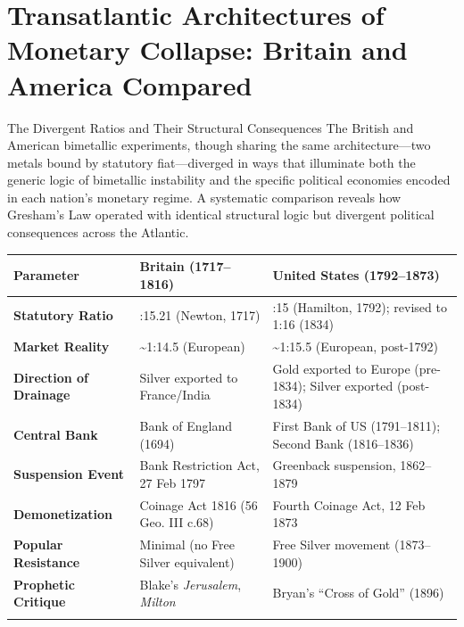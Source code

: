 \documentclass[
  ignorenonframetext,
]{beamer}
\author{\texorpdfstring{}{}}
\date{}
\newcounter{none} %
\begin{document}
\section{Transatlantic Architectures of Monetary Collapse: Britain and
America
Compared}\label{transatlantic-architectures-of-monetary-collapse-britain-and-america-compared}

\begin{frame}{The Divergent Ratios and Their Structural Consequences}
\protect{}\label{the-divergent-ratios-and-their-structural-consequences}
The British and American bimetallic experiments, though sharing the same
architecture---two metals bound by statutory fiat---diverged in ways
that illuminate both the generic logic of bimetallic instability and the
specific political economies encoded in each nation's monetary regime. A
systematic comparison reveals how Gresham's Law operated with identical
structural logic but divergent political consequences across the
Atlantic.

{\def\LTcaptype{none} %
\begin{longtable}[]{@{}
  >{\raggedright\arraybackslash}p{}
  >{\raggedright\arraybackslash}p{}
  >{\raggedright\arraybackslash}p{}@{}}
\toprule\noalign{}
\begin{minipage}[b]{\linewidth}\raggedright
Parameter
\end{minipage} & \begin{minipage}[b]{\linewidth}\raggedright
Britain (1717--1816)
\end{minipage} & \begin{minipage}[b]{\linewidth}\raggedright
United States (1792--1873)
\end{minipage} \\
\midrule\noalign{}
\endhead
\textbf{Statutory Ratio} & 1:15.21 (Newton, 1717) & 1:15 (Hamilton,
1792); revised to 1:16 (1834) \\
\textbf{Market Reality} & \textasciitilde1:14.5 (European) &
\textasciitilde1:15.5 (European, post-1792) \\
\textbf{Direction of Drainage} & Silver exported to France/India & Gold
exported to Europe (pre-1834); Silver exported (post-1834) \\
\textbf{Central Bank} & Bank of England (1694) & First Bank of US
(1791--1811); Second Bank (1816--1836) \\
\textbf{Suspension Event} & Bank Restriction Act, 27 Feb 1797 &
Greenback suspension, 1862--1879 \\
\textbf{Demonetization} & Coinage Act 1816 (56 Geo. III c.68) & Fourth
Coinage Act, 12 Feb 1873 \\
\textbf{Popular Resistance} & Minimal (no Free Silver equivalent) & Free
Silver movement (1873--1900) \\
\textbf{Prophetic Critique} & Blake's \emph{Jerusalem}, \emph{Milton} &
Bryan's ``Cross of Gold'' (1896) \\
\bottomrule\noalign{}
\end{longtable}
}


\end{frame}
\end{document}
